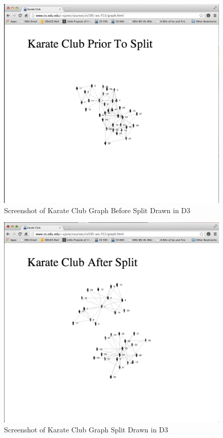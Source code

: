 \documentclass[letterpaper,11pt]{article}
\begin{document}
\clearpage
\begin{figure}[h]
\includegraphics[scale=0.4]{club-before-screenie.png}
\caption{Screenshot of Karate Club Graph Before Split Drawn in D3}
\label{fig:club-before}
\end{figure}

\clearpage
\begin{figure}[h]
\includegraphics[scale=0.4]{club-after-screenie.png}
\caption{Screenshot of Karate Club Graph Split Drawn in D3}
\label{fig:club-after}
\end{figure}
\end{document}
